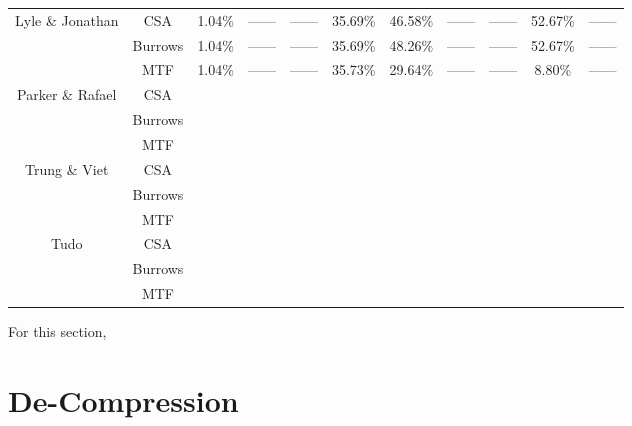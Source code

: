 \documentclass[12pt]{article}
\begin{document}
\begin{table}[H]
{\begin{tabular}{c|c|ccccccccc}
		Lyle \& Jonathan     & CSA      & 1.04\% & ------ & ------ & 35.69\% & 46.58\% & ------ & ------ & 52.67\% & ------  \\
                             & Burrows  & 1.04\% & ------ & ------ & 35.69\% & 48.26\% & ------ & ------ & 52.67\% & ------  \\
                             & MTF      & 1.04\% & ------ & ------ & 35.73\% & 29.64\% & ------ & ------ & 8.80\%  & ------  \\ \hline

		Parker \& Rafael     & CSA      &  &  &  &  &  &  &  &  &   \\
                             & Burrows  &  &  &  &  &  &  &  &  &   \\
                             & MTF      &  &  &  &  &  &  &  &  &   \\ \hline

		Trung \& Viet        & CSA      &  &  &  &  &  &  &  &  &   \\
                             & Burrows  &  &  &  &  &  &  &  &  &   \\
                             & MTF      &  &  &  &  &  &  &  &  &   \\ \hline

        Tudo                 & CSA      &  &  &  &  &  &  &  &  &   \\
                             & Burrows  &  &  &  &  &  &  &  &  &   \\
                             & MTF      &  &  &  &  &  &  &  &  &   \\ \hline
		\bottomrule
	\end{tabular}}
\end{table}
For this section,



\section{De-Compression}
\end{document}
